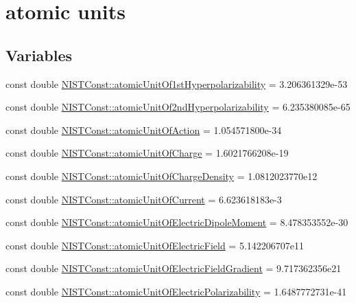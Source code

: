 \hypertarget{group___atomic_unit}{}\section{atomic units}
\label{group___atomic_unit}
\subsection*{Variables}
\begin{DoxyCompactItemize}
\item 
const double \hyperlink{group___atomic_unit_gaa43ceaed22f3b69aee64d117cae645fb}{N\+I\+S\+T\+Const\+::atomic\+Unit\+Of1st\+Hyperpolarizability} = 3.\+206361329e-\/53
\item 
const double \hyperlink{group___atomic_unit_ga55b22fa50aa069b98aa1bcb050206a8e}{N\+I\+S\+T\+Const\+::atomic\+Unit\+Of2nd\+Hyperpolarizability} = 6.\+235380085e-\/65
\item 
const double \hyperlink{group___atomic_unit_ga6685e215d87395646fc18e2efa30d7a0}{N\+I\+S\+T\+Const\+::atomic\+Unit\+Of\+Action} = 1.\+054571800e-\/34
\item 
const double \hyperlink{group___atomic_unit_ga1a42bd5db581dc5bf7a87b864bc77cf4}{N\+I\+S\+T\+Const\+::atomic\+Unit\+Of\+Charge} = 1.\+6021766208e-\/19
\item 
const double \hyperlink{group___atomic_unit_gaa1918065ee8731837afe6bddee194320}{N\+I\+S\+T\+Const\+::atomic\+Unit\+Of\+Charge\+Density} = 1.\+0812023770e12
\item 
const double \hyperlink{group___atomic_unit_ga6d0f3cfc8aaa2aeb120559aaea2dc5c6}{N\+I\+S\+T\+Const\+::atomic\+Unit\+Of\+Current} = 6.\+623618183e-\/3
\item 
const double \hyperlink{group___atomic_unit_ga108a8be4e32eddd7cdfdf4473f3532ab}{N\+I\+S\+T\+Const\+::atomic\+Unit\+Of\+Electric\+Dipole\+Moment} = 8.\+478353552e-\/30
\item 
const double \hyperlink{group___atomic_unit_gab8b246e91a41cadb97f128210a6c81db}{N\+I\+S\+T\+Const\+::atomic\+Unit\+Of\+Electric\+Field} = 5.\+142206707e11
\item 
const double \hyperlink{group___atomic_unit_ga45f55b90a26e2e96f00c2664ddd79f11}{N\+I\+S\+T\+Const\+::atomic\+Unit\+Of\+Electric\+Field\+Gradient} = 9.\+717362356e21
\item 
const double \hyperlink{group___atomic_unit_ga5809393ec8d30cbb7e0c7a2f168e48ec}{N\+I\+S\+T\+Const\+::atomic\+Unit\+Of\+Electric\+Polarizability} = 1.\+6487772731e-\/41
\item 

\end{DoxyCompactItemize}
